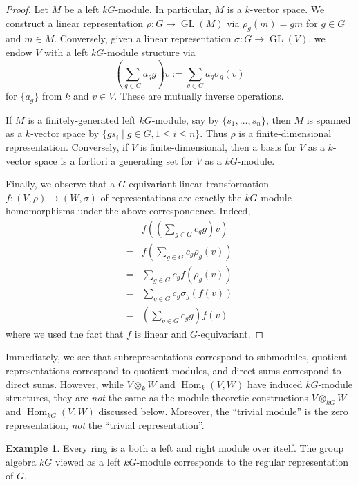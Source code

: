 \documentclass[12pt]{article}
\theoremstyle{plain}
\theoremstyle{definition}
\newtheorem{example}[theorem]{Example}
\theoremstyle{remark}
\numberwithin{equation}{section}
\begin{document}
\begin{proof}
Let $M$ be a left $kG$-module.
In particular, $M$ is a $k$-vector space.
We construct a linear representation $\rho : G \to \operatorname{GL}(M)$
via $\rho_g(m)=gm$ for $g \in G$ and $m\in M$.
Conversely, given a linear representation $\sigma : G \to
\operatorname{GL}(V)$, we endow $V$ with a left $kG$-module structure via
\[
\left( \sum_{g \in G} a_g g \right) v := \sum_{g \in G} a_g \sigma_g(v)
\]
for $\{a_g\}$ from $k$ and $v \in V$.
These are mutually inverse operations.

If $M$ is a finitely-generated left $kG$-module,
say by $\{s_1,\ldots,s_n\}$, then $M$ is spanned as a $k$-vector space
by $\{ gs_i \mid g \in G, 1 \le i \le n \}$.
Thus $\rho$ is a finite-dimensional representation.
Conversely, if $V$ is finite-dimensional, then a basis for $V$
as a $k$-vector space is a fortiori a generating set for $V$ as a
$kG$-module.

Finally, we observe that a $G$-equivariant linear transformation
$f : (V,\rho) \to (W,\sigma)$ of representations are exactly the $kG$-module
homomorphisms under the above correspondence.
Indeed,
\begin{align*}
&f\left( \left( \sum_{g\in G} c_g g \right) v \right)\\
=& f\left( \sum_{g\in G} c_g \rho_g(v) \right)\\
=& \sum_{g\in G} c_g f\left( \rho_g(v) \right)\\
=& \sum_{g\in G} c_g \sigma_g\left(f(v)\right)\\
=& \left(\sum_{g\in G} c_g g\right) f(v)
\end{align*}
where we used the fact that $f$ is linear and $G$-equivariant.
\end{proof}

Immediately, we see that subrepresentations correspond to submodules,
quotient representations correspond to quotient modules, and direct sums
correspond to direct sums.
However, while $V \otimes_k W$ and $\operatorname{Hom}_k(V,W)$ have
induced $kG$-module structures, they are \emph{not} the same as the
module-theoretic constructions $V \otimes_{kG} W$
and $\operatorname{Hom}_{kG}(V,W)$ discussed below.
Moreover, the ``trivial module'' is the zero representation,
\emph{not} the ``trivial representation''.

\begin{example}
Every ring is a both a left and right module over itself.
The group algebra $kG$ viewed as a left $kG$-module corresponds to
the regular representation of $G$.
\end{example}
\end{document}
